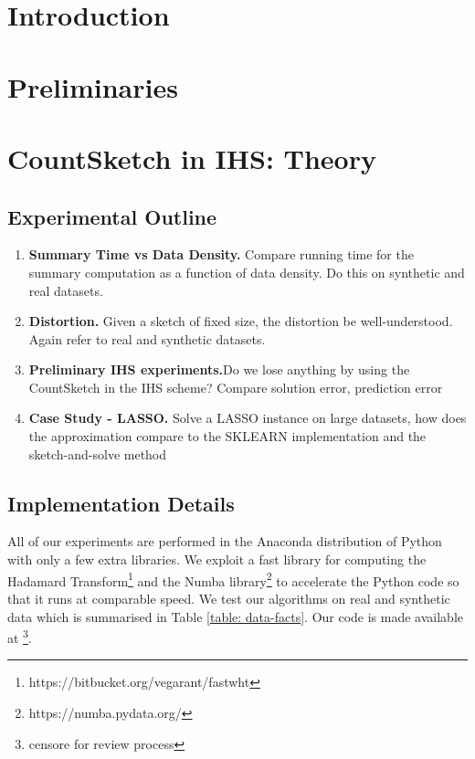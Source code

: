 \documentclass[twoside]{article}
\theoremstyle{definition}\newtheorem{thm}{Theorem}[section]
\theoremstyle{definition}\newtheorem{mydef}[thm]{Definition}
\theoremstyle{definition}\newtheorem{rem}[thm]{Remark}
\theoremstyle{definition}\newtheorem{prop}[thm]{Proposition}
\theoremstyle{definition}\newtheorem{example}[thm]{Example}
\theoremstyle{definition}\newtheorem{claim}[thm]{Claim}
\theoremstyle{definition}\newtheorem{Qu}[thm]{Question}
\theoremstyle{definition}\newtheorem{Lemma}[thm]{Lemma}
\theoremstyle{definition}\newtheorem{Cor}[thm]{Corollary}
\theoremstyle{definition}\newtheorem{Fact}[]{Fact}
\begin{document}
\section{Introduction} \label{sec: intro}



\section{Preliminaries} \label{sec: preliminaries}


\section{CountSketch in IHS: Theory} \label{sec: countsketch-properties}
\subsection{Experimental Outline}

\begin{enumerate}
  \item{\textbf{Summary Time vs Data Density.}  Compare running time for the
  summary computation as a function of data density.
  Do this on synthetic and real datasets.}
  \item{\textbf{Distortion.}  Given a sketch of fixed size, the distortion be
  well-understood.  Again refer to real and synthetic datasets.}
  \item{\textbf{Preliminary IHS experiments.}Do we lose anything by using the
  CountSketch in the IHS scheme? Compare solution error, prediction error}
  \item{\textbf{Case Study - LASSO.} Solve a LASSO
  instance on large datasets, how does the approximation compare to the SKLEARN
  implementation and the sketch-and-solve method}
\end{enumerate}




\subsection{Implementation Details}

All of our experiments are performed in the Anaconda distribution of Python
with only a few extra libraries.
We exploit a fast library for computing the Hadamard
Transform\footnote{https://bitbucket.org/vegarant/fastwht} and the Numba
library\footnote{https://numba.pydata.org/} to accelerate the Python code
so that it runs at comparable speed.
We test our algorithms on real and synthetic data which is summarised in Table
\ref{table: data-facts}.
Our code is made available at
\footnote{censore for review process}.
\end{document}
